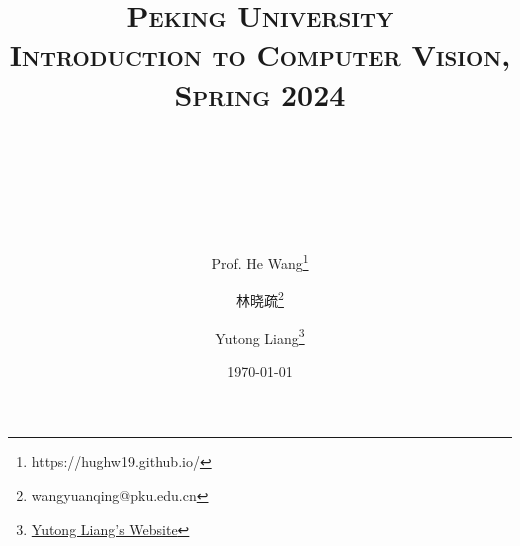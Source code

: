 

\title{
{\normalfont\normalsize\textsc{
Peking University\\
Introduction to Computer Vision, Spring 2024 \\[25pt]}}
\horrule{0.5pt}\\
\\
\horrule{1.8pt}\\[20pt]
}

\author[1]{Prof. He Wang\thanks{https://hughw19.github.io/}}
\author[2]{林晓疏\thanks{wangyuanqing@pku.edu.cn}}
\author[2]{Yutong Liang\thanks{\href{https://lyt0112.com/}{Yutong Liang's Website}}}

\date{\today}

\pagestyle{fancy}
\fancyhf{}
\fancyhead[L]{\leftmark}  %
\fancyfoot[C]{\thepage}  %



	\maketitle
	
	\clearpage
	\tableofcontents
	
	
	
	
	
	
	
	
	
	
	
	
	
	
	
	
	
	
	
	
	
	
	
	
	


	\clearpage
	\appendix
	
	
		
	

    
    
